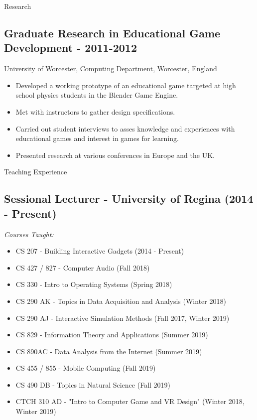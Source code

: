 \documentclass{resume} %
\begin{document}
\begin{rSection}{Research}
\subsection*{Graduate Research in Educational Game Development - 2011-2012}
University of Worcester, Computing Department, Worcester, England
\begin{itemize}
    \item Developed a working prototype of an educational game targeted at high school physics students
    in the Blender Game Engine.
    \item Met with instructors to gather design specifications.
    \item Carried out student interviews to asses knowledge and experiences with educational 
    games and interest in games for learning.
    \item Presented research at various conferences in Europe and the UK. 
\end{itemize}
\end{rSection}

\begin{rSection}{Teaching Experience}
\subsection*{Sessional Lecturer - University of Regina (2014 - Present)}
\emph{Courses Taught:}
\begin{itemize}
    \item CS 207 - Building Interactive Gadgets (2014 - Present)
    \item CS 427 / 827 - Computer Audio (Fall 2018)
    \item CS 330 - Intro to Operating Systems (Spring 2018)
    \item CS 290 AK - Topics in Data Acquisition and Analysis (Winter 2018)
    \item CS 290 AJ - Interactive Simulation Methods (Fall 2017, Winter 2019)
    \item CS 829 - Information Theory and Applications (Summer 2019)
    \item CS 890AC - Data Analysis from the Internet (Summer 2019)
    \item CS 455 / 855 - Mobile Computing (Fall 2019)
    \item CS 490 DB - Topics in Natural Science (Fall 2019)
    \item CTCH 310 AD - "Intro to Computer Game and VR Design" (Winter 2018, Winter 2019)
 \end{itemize} 
\end{rSection}
\end{document}
